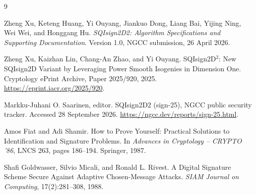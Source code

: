 \documentclass[11pt,a4paper]{article}
\begin{document}
\begin{thebibliography}{9}

Zheng Xu, Keteng Huang, Yi Ouyang, Jiankuo Dong, Liang Bai, Yijing Ning,
Wei Wei, and Honggang Hu.
\newblock \emph{SQIsign2D2: Algorithm Specifications and Supporting Documentation}.
\newblock Version 1.0, NGCC submission, 26 April 2026.

Zheng Xu, Kaizhan Lin, Chang-An Zhao, and Yi Ouyang.
\newblock SQIsign2D$^2$: New SQIsign2D Variant by Leveraging Power Smooth
Isogenies in Dimension One.
\newblock Cryptology ePrint Archive, Paper 2025/920, 2025.
\newblock \url{https://eprint.iacr.org/2025/920}.

Markku-Juhani O. Saarinen, editor.
\newblock SQIsign2D2 (sign-25), NGCC public security tracker.
\newblock Accessed 28 September 2026.
\newblock \url{https://ngcc.dev/reports/sign-25.html}.

Amos Fiat and Adi Shamir.
\newblock How to Prove Yourself: Practical Solutions to Identification and Signature Problems.
\newblock In \emph{Advances in Cryptology -- CRYPTO '86}, LNCS 263, pages 186--194.
Springer, 1987.

Shafi Goldwasser, Silvio Micali, and Ronald L. Rivest.
\newblock A Digital Signature Scheme Secure Against Adaptive Chosen-Message Attacks.
\newblock \emph{SIAM Journal on Computing}, 17(2):281--308, 1988.

\end{thebibliography}
\end{document}
